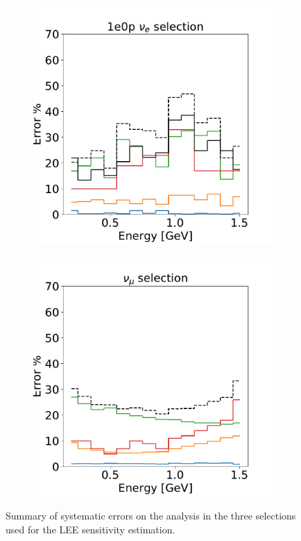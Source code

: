 \begin{figure}[H]
\begin{center}
\begin{subfigure}[b]{0.32\textwidth}
    \includegraphics[width=1.00\textwidth]{Systematics/1e0p_syst_summary.pdf}
    \caption{\label{fig:systsummary:zp}\zpsel}
    \end{subfigure}
    \begin{subfigure}[b]{0.32\textwidth}
    \centering
    \includegraphics[width=1.00\textwidth]{Systematics/numu_syst_summary.pdf}
    \caption{\label{fig:systsummary:numu}\numu}
    \end{subfigure}
\caption{\label{fig:systsummaryintro}Summary of systematic errors on the analysis in the three selections used for the LEE sensitivity estimation.}
\end{center}
\end{figure}


